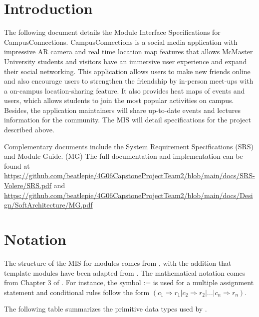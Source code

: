 \documentclass[12pt, titlepage]{article}
\begin{document}

\section{Introduction}

The following document details the Module Interface Specifications for CampusConnections. CampusConnections is a social media application with impressive AR camera and real time location map features that allows McMaster University students and visitors have an immersive user experience and expand their social networking. This application allows users to make new friends online and also encourage users to strengthen the friendship by in-person meet-ups with a on-campus location-sharing feature. It also provides heat maps of events and users, which allows students to join the most popular activities on campus. Besides, the application maintainers will share up-to-date events and lectures information for the community. The MIS will detail specifications for the project described above.

Complementary documents include the System Requirement Specifications (SRS)
and Module Guide. (MG)  The full documentation and implementation can be
found at \url{https://github.com/beatlepie/4G06CapstoneProjectTeam2/blob/main/docs/SRS-Volere/SRS.pdf} and \url{https://github.com/beatlepie/4G06CapstoneProjectTeam2/blob/main/docs/Design/SoftArchitecture/MG.pdf}

\section{Notation}
The structure of the MIS for modules comes from \citet{HoffmanAndStrooper1995},
with the addition that template modules have been adapted from
\cite{GhezziEtAl2003}.  The mathematical notation comes from Chapter 3 of
\citet{HoffmanAndStrooper1995}.  For instance, the symbol := is used for a
multiple assignment statement and conditional rules follow the form $(c_1
\Rightarrow r_1 | c_2 \Rightarrow r_2 | ... | c_n \Rightarrow r_n )$.

The following table summarizes the primitive data types used by \progname. 
\end{document}
